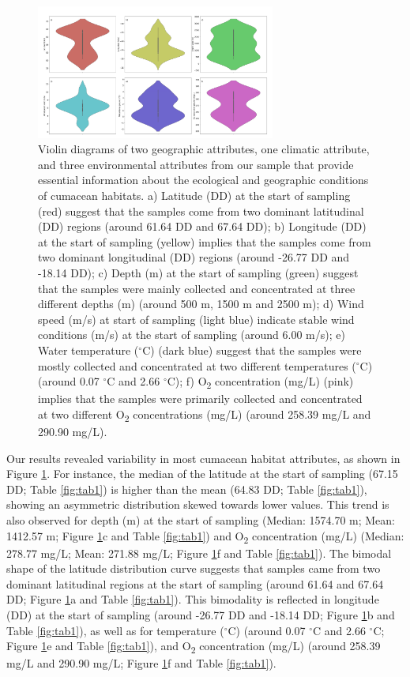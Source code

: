 \begin{figure}[htbp]
    \centering
    \includegraphics[width=0.7\textwidth]{figure1.jpg}
    \caption{Violin diagrams of two geographic attributes, one climatic attribute, and three environmental attributes from our sample that provide essential information about the ecological and geographic conditions of cumacean habitats. a) Latitude (DD) at the start of sampling (red) suggest that the samples come from two dominant latitudinal (DD) regions (around 61.64 DD and 67.64 DD); b) Longitude (DD) at the start of sampling (yellow) implies that the samples come from two dominant longitudinal (DD) regions (around -26.77 DD and -18.14 DD); c) Depth (m) at the start of sampling (green) suggest that the samples were mainly collected and concentrated at three different depths (m) (around 500 m, 1500 m and 2500 m); d) Wind speed (m/s) at start of sampling (light blue) indicate stable wind conditions (m/s) at the start of sampling (around 6.00 m/s); e) Water temperature ($^\circ$C) (dark blue) suggest that the samples were mostly collected and concentrated at two different temperatures ($^\circ$C) (around 0.07 $^\circ$C and 2.66 $^\circ$C); f) O\textsubscript{2} concentration (mg/L) (pink) implies that the samples were primarily collected and concentrated at two different O\textsubscript{2} concentrations (mg/L) (around 258.39 mg/L and 290.90 mg/L). \label{fig:fig2}}
\end{figure}

Our results revealed variability in most cumacean habitat attributes, as shown in Figure \ref{fig:fig2}. For instance, the median of the latitude at the start of sampling (67.15 DD; Table \ref{fig:tab1}) is higher than the mean (64.83 DD; Table \ref{fig:tab1}), showing an asymmetric distribution skewed towards lower values. This trend is also observed for depth (m) at the start of sampling (Median: 1574.70 m; Mean: 1412.57 m; Figure \ref{fig:fig2}c and Table \ref{fig:tab1}) and O\textsubscript{2} concentration (mg/L) (Median: 278.77 mg/L; Mean: 271.88 mg/L; Figure \ref{fig:fig2}f and Table \ref{fig:tab1}). The bimodal shape of the latitude distribution curve suggests that samples came from two dominant latitudinal regions at the start of sampling (around 61.64 and 67.64 DD; Figure \ref{fig:fig2}a and Table \ref{fig:tab1}). This bimodality is reflected in longitude (DD) at the start of sampling (around -26.77 DD and -18.14 DD; Figure \ref{fig:fig2}b and Table \ref{fig:tab1}), as well as for temperature ($^\circ$C) (around 0.07 $^\circ$C and 2.66 $^\circ$C; Figure \ref{fig:fig2}e and Table \ref{fig:tab1}), and O\textsubscript{2} concentration (mg/L) (around 258.39 mg/L and 290.90 mg/L; Figure \ref{fig:fig2}f and Table \ref{fig:tab1}).

